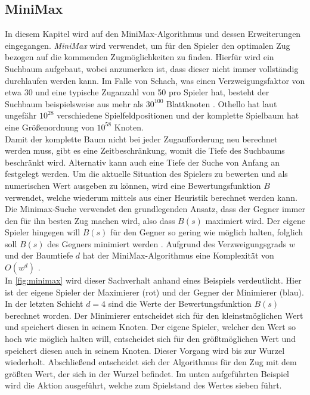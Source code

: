 \documentclass[12pt,a4paper,bibliography=totocnumbered,listof=totocnumbered]{article}
\begin{document}
\subsection{MiniMax} \label{sec:minimax}
In diesem Kapitel wird auf den MiniMax-Algorithmus und dessen Erweiterungen eingegangen. \emph{MiniMax} wird verwendet, um für den Spieler den optimalen Zug bezogen auf die kommenden Zugmöglichkeiten zu finden.
Hierfür wird ein Suchbaum aufgebaut, wobei anzumerken ist, dass dieser nicht immer vollständig durchlaufen werden kann. Im Falle von Schach, was einen Verzweigungsfaktor von etwa 30 und eine typische Zuganzahl von 50 pro Spieler hat, besteht der Suchbaum beispielsweise aus mehr als $30^{100}$ Blattknoten \citep{Heinemann.2016}. Othello hat laut \cite{Shantanu.2018} ungefähr $10^{28}$ verschiedene Spielfeldpositionen und der komplette Spielbaum hat eine Größenordnung von $10^{58}$ Knoten.\\
Damit der komplette Baum nicht bei jeder Zugaufforderung neu berechnet werden muss, gibt es eine Zeitbeschränkung, womit die Tiefe des Suchbaums beschränkt wird. Alternativ kann auch eine Tiefe der Suche von Anfang an festgelegt werden. Um die aktuelle Situation des Spielers zu bewerten und als numerischen Wert ausgeben zu können, wird eine Bewertungsfunktion $B$ verwendet, welche wiederum mittels aus einer Heuristik berechnet werden kann.\\
Die Minimax-Suche verwendet den grundlegenden Ansatz, dass der Gegner immer den für ihn besten Zug machen wird, also dass $B(s)$ maximiert wird. Der eigene Spieler hingegen will $B(s)$ für den Gegner so gering wie möglich halten, folglich soll $B(s)$ des Gegners minimiert werden \citep[S. 174 ff.]{Heinemann.2016}. Aufgrund des Verzweigungsgrads $w$ und der Baumtiefe $d$ hat der MiniMax-Algorithmus eine Komplexität von $O(w^d)$ \cite[Kapitel 6]{CarstenKern.2021}.\\ In \autoref{fig:minimax} wird dieser Sachverhalt anhand eines Beispiels verdeutlicht. Hier ist der eigene Spieler der Maximierer (rot) und der Gegner der Minimierer (blau). In der letzten Schicht $d=4$ sind die Werte der Bewertungsfunktion $B(s)$ berechnet worden. Der Minimierer entscheidet sich für den kleinstmöglichen Wert und speichert diesen in seinem Knoten. Der eigene Spieler, welcher den Wert so hoch wie möglich halten will, entscheidet sich für den größtmöglichen Wert und speichert diesen auch in seinem Knoten. Dieser Vorgang wird bis zur Wurzel wiederholt. Abschließend entscheidet sich der Algorithmus für den Zug mit dem größten Wert, der sich in der Wurzel befindet. Im unten aufgeführten Beispiel wird die Aktion ausgeführt, welche zum Spielstand des Wertes sieben führt.\\
\end{document}
